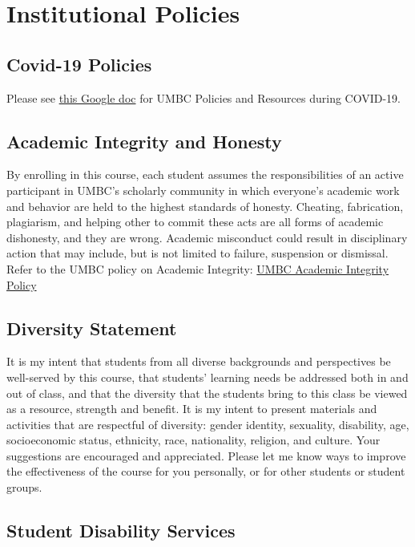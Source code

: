 \documentclass[11pt]{article}
\begin{document}
\section*{Institutional Policies}

\subsection*{Covid-19 Policies}
Please see \href{https://docs.google.com/document/d/1xWWGAR8qEzKYr7qaVHoEhvO6lyXIyn6M3M7EFZPJQgA/edit?usp=sharing}{this Google doc} for UMBC Policies and Resources during COVID-19. 

\subsection*{Academic Integrity and Honesty}

By enrolling in this course, each student assumes the responsibilities of an active participant in UMBC’s scholarly community in which everyone's academic work and behavior are held to the highest standards of honesty.  Cheating, fabrication, plagiarism, and helping other to commit these acts are all forms of academic dishonesty, and they are wrong.  Academic misconduct could result in disciplinary action that may include, but is not limited to failure, suspension or dismissal.  
\newline
Refer to the UMBC policy on Academic Integrity: \href{https://catalog.umbc.edu/content.php?catoid=17&navoid=879#academic-integrity}{UMBC Academic Integrity Policy}


\subsection*{Diversity Statement}
It is my intent that students from all diverse backgrounds and perspectives be well-served by this course, that students' learning needs be addressed both in and out of class, and that the diversity that the students bring to this class be viewed as a resource, strength and benefit. It is my intent to present materials and activities that are respectful of diversity: gender identity, sexuality, disability, age, socioeconomic status, ethnicity, race, nationality, religion, and culture. Your suggestions are encouraged and appreciated. Please let me know ways to improve the effectiveness of the course for you personally, or for other students or student groups.

\subsection*{Student Disability Services}
\end{document}
